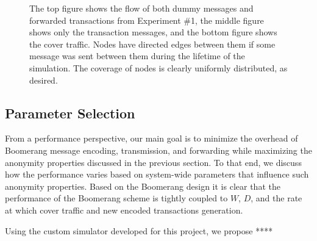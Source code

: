 \begin{figure}[ht!]
\begin{center}
\caption{The top figure shows the flow of both dummy messages and forwarded transactions from Experiment \#1, the middle figure shows only the transaction messages, and the bottom figure shows the cover traffic. Nodes have directed edges between them if some message was sent between them during the lifetime of the simulation. The coverage of nodes is clearly uniformly distributed, as desired.}
\label{fig:boomerang_message}
\end{center}
\end{figure}

\subsection{Parameter Selection}

From a performance perspective, our main goal is to minimize the overhead of Boomerang message encoding, transmission, and forwarding while maximizing the anonymity properties discussed in the previous section. To that end, we discuss how the performance varies based on system-wide parameters that influence such anonymity properties. Based on the Boomerang design it is clear that the performance of the Boomerang scheme is tightly coupled to $W$, $D$, and the rate at which cover traffic and new encoded transactions generation.

Using the custom simulator developed for this project, we propose ****


